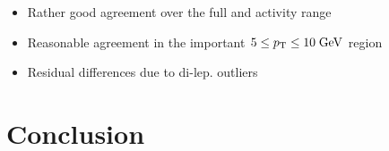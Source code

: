 \documentclass{beamer}
\begin{document}
\begin{frame}
\begin{columns}
\begin{column}{0.33\textwidth}
   \end{column}
  \end{columns}
  \begin{itemize}
   \item Rather good agreement over the full \pt and activity range
   \item Reasonable agreement in the important $5\leq p_{\text{T}}\leq10\;\text{Ge}\kern-0.06667em\text{V}$ region
      \item Residual differences due to di-lep. outliers \ttbar
  \end{itemize}
\end{frame}

\section{Conclusion}
\end{document}
